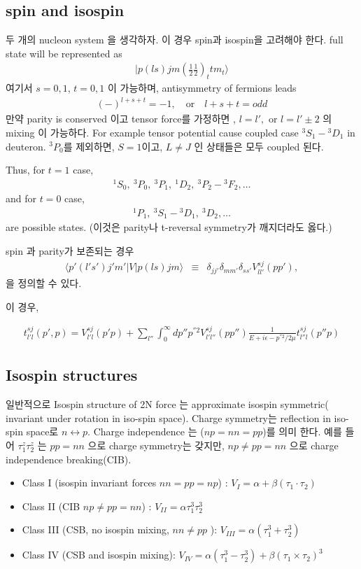 \documentclass[10pt]{article}
\newcommand{\bea}{\begin{eqnarray}}
\newcommand{\eea}{\end{eqnarray}}
\def\la{\langle}
\def\ra{\rangle}
\begin{document}
\subsection{spin and isospin}
두 개의 nucleon system 을 생각하자. 이 경우 spin과 isospin을 고려해야 한다.
full state will be represented as
\bea
|p(ls)jm(\frac{1}{2}\frac{1}{2})_t t m_t\ra              
\eea
여기서 $s=0,1$, $t=0,1$ 이 가능하며, antisymmetry of fermions leads
\bea
(-)^{l+s+t}=-1,\quad\mbox{or}\quad l+s+t=odd
\eea 
만약 parity is conserved 이고 tensor force를 가정하면 ,  
$l=l',\mbox{  or  } l=l'\pm 2 $ 의 mixing 이 가능하다.
For example tensor potential cause coupled case ${}^3S_1-{}^3D_1$ in deuteron. $^3P_0$를 제외하면, 
$S=1$이고, $L\neq J$ 인 상태들은 모두 coupled 된다. 

Thus, for $t=1$ case,
\bea
{}^1S_0,\ {}^3P_0,\ {}^3P_1,\ {}^1D_2,\ {}^3P_2-{}^3F_2,\dots
\eea
and for $t=0$ case,
\bea
{}^1P_1,\ {}^3S_1-{}^3D_1,\ {}^3 D_2,\dots
\eea
are possible states. (이것은 parity나 t-reversal symmetry가 깨지더라도 옳다.)

spin 과 parity가 보존되는 경우 
\bea
\la p'(l's')j'm'|V|p(ls)jm\ra&\equiv&
\delta_{jj'}\delta_{mm'}\delta_{ss'}
V^{sj}_{ll'}(pp'), 
\eea
을 정의할 수 있다. 

이 경우,

\bea
t^{sj}_{l'l}(p',p)=V^{sj}_{l'l}(p'p)+\sum_{l''}\int_0^\infty dp'' p^{''2} V^{sj}_{l'l''}(pp'')
                       \frac{1}{E+i\epsilon-p^{''2}/2\mu}t^{sj}_{l''l}(p'' p)
\eea

\subsection{Isospin structures}
일반적으로 Isospin structure of 2N force 는 approximate
isospin symmetric( invariant under rotation in iso-spin space).
Charge symmetry는 reflection in iso-spin space로 
$n\leftrightarrow p$. Charge independence 는 
($np=nn=pp$)를 의미 한다. 예를 들어 $\tau_1^z\tau_2^z$ 는 
$pp=nn$ 으로 charge symmetry는 갖지만, $np\neq pp=nn$ 으로 
charge independence breaking(CIB).

\begin{itemize}
\item Class I (isospin invariant forces $nn=pp=np$) : $V_{I}=\alpha+\beta(\tau_1\cdot\tau_2)$

\item Class II (CIB $np\neq pp=nn$) :
$V_{II}=\alpha \tau_1^3\tau_2^3$

 \item Class III (CSB, 
                  no isospin mixing,
                  $ nn\neq pp$ ):
 $V_{III}=\alpha(\tau_1^3+\tau_2^3)$ 

\item Class IV (CSB and isospin mixing):
$V_{IV}=\alpha(\tau_1^3-\tau_2^3)+\beta(\tau_1\times\tau_2)^3$

\end{itemize}
\end{document}
